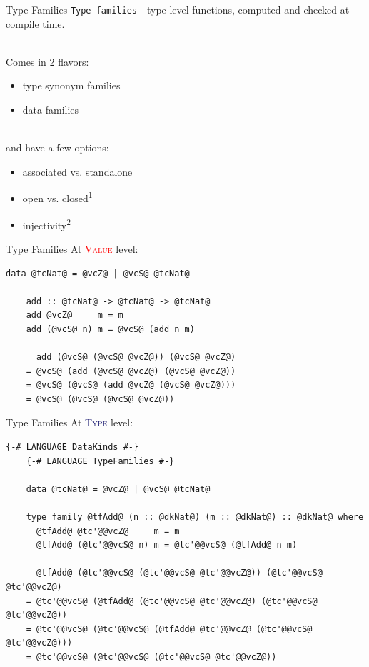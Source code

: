\documentclass[xcolor={usenames,dvipsnames}]{beamer}
\newcommand{\htycon}[1]{\textcolor{MidnightBlue}{\textsc{#1}}}
\newcommand{\hvalcon}[1]{\textcolor{Red}{\textsc{#1}}}
\begin{document}
\begin{frame}[fragile]{Type Families}
  \texttt{Type families} - type level functions, computed and checked at compile time.

  \ \\
  Comes in 2 flavors:
  \begin{itemize}
    \item type synonym families
    \item data families
  \end{itemize}

  \ \\
  and have a few options:
  \begin{itemize}
    \item associated vs. standalone
    \item open vs. closed\textsuperscript{1}
    \item injectivity\textsuperscript{2}
  \end{itemize}
\end{frame}

\begin{frame}[fragile]{Type Families}
  At \hvalcon{Value} level:
  \begin{lstlisting}[style=hask]
    data @tcNat@ = @vcZ@ | @vcS@ @tcNat@

    add :: @tcNat@ -> @tcNat@ -> @tcNat@
    add @vcZ@     m = m
    add (@vcS@ n) m = @vcS@ (add n m)

      add (@vcS@ (@vcS@ @vcZ@)) (@vcS@ @vcZ@)
    = @vcS@ (add (@vcS@ @vcZ@) (@vcS@ @vcZ@))
    = @vcS@ (@vcS@ (add @vcZ@ (@vcS@ @vcZ@)))
    = @vcS@ (@vcS@ (@vcS@ @vcZ@))
  \end{lstlisting}
\end{frame}

\begin{frame}[fragile]{Type Families}
  At \htycon{Type} level:
  \begin{lstlisting}[style=hask]
    {-# LANGUAGE DataKinds #-}
    {-# LANGUAGE TypeFamilies #-}

    data @tcNat@ = @vcZ@ | @vcS@ @tcNat@

    type family @tfAdd@ (n :: @dkNat@) (m :: @dkNat@) :: @dkNat@ where
      @tfAdd@ @tc'@@vcZ@     m = m
      @tfAdd@ (@tc'@@vcS@ n) m = @tc'@@vcS@ (@tfAdd@ n m)

      @tfAdd@ (@tc'@@vcS@ (@tc'@@vcS@ @tc'@@vcZ@)) (@tc'@@vcS@ @tc'@@vcZ@)
    = @tc'@@vcS@ (@tfAdd@ (@tc'@@vcS@ @tc'@@vcZ@) (@tc'@@vcS@ @tc'@@vcZ@))
    = @tc'@@vcS@ (@tc'@@vcS@ (@tfAdd@ @tc'@@vcZ@ (@tc'@@vcS@ @tc'@@vcZ@)))
    = @tc'@@vcS@ (@tc'@@vcS@ (@tc'@@vcS@ @tc'@@vcZ@))
  \end{lstlisting}
\end{frame}
\end{document}
